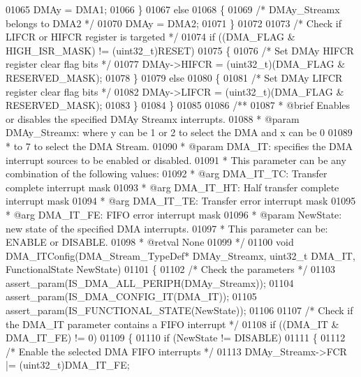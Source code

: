 \begin{DoxyCode}
01065     DMAy = DMA1;
01066   \}
01067   \textcolor{keywordflow}{else}
01068   \{
01069     \textcolor{comment}{/* DMAy\_Streamx belongs to DMA2 */}
01070     DMAy = DMA2;
01071   \}
01072 
01073   \textcolor{comment}{/* Check if LIFCR or HIFCR register is targeted */}
01074   \textcolor{keywordflow}{if} ((DMA\_FLAG & HIGH_ISR_MASK) != (uint32\_t)RESET)
01075   \{
01076     \textcolor{comment}{/* Set DMAy HIFCR register clear flag bits */}
01077     DMAy->HIFCR = (uint32\_t)(DMA\_FLAG & RESERVED_MASK);
01078   \}
01079   \textcolor{keywordflow}{else}
01080   \{
01081     \textcolor{comment}{/* Set DMAy LIFCR register clear flag bits */}
01082     DMAy->LIFCR = (uint32\_t)(DMA\_FLAG & RESERVED_MASK);
01083   \}
01084 \}
01085 
01086 \textcolor{comment}{/**}
01087 \textcolor{comment}{  * @brief  Enables or disables the specified DMAy Streamx interrupts.}
01088 \textcolor{comment}{  * @param  DMAy\_Streamx: where y can be 1 or 2 to select the DMA and x can be 0}
01089 \textcolor{comment}{  *          to 7 to select the DMA Stream.}
01090 \textcolor{comment}{  * @param DMA\_IT: specifies the DMA interrupt sources to be enabled or disabled. }
01091 \textcolor{comment}{  *          This parameter can be any combination of the following values:}
01092 \textcolor{comment}{  *            @arg DMA\_IT\_TC:  Transfer complete interrupt mask}
01093 \textcolor{comment}{  *            @arg DMA\_IT\_HT:  Half transfer complete interrupt mask}
01094 \textcolor{comment}{  *            @arg DMA\_IT\_TE:  Transfer error interrupt mask}
01095 \textcolor{comment}{  *            @arg DMA\_IT\_FE:  FIFO error interrupt mask}
01096 \textcolor{comment}{  * @param  NewState: new state of the specified DMA interrupts.}
01097 \textcolor{comment}{  *          This parameter can be: ENABLE or DISABLE.}
01098 \textcolor{comment}{  * @retval None}
01099 \textcolor{comment}{  */}
01100 \textcolor{keywordtype}{void} DMA_ITConfig(DMA\_Stream\_TypeDef* DMAy\_Streamx, uint32\_t DMA\_IT, FunctionalState NewState)
01101 \{
01102   \textcolor{comment}{/* Check the parameters */}
01103   assert_param(IS\_DMA\_ALL\_PERIPH(DMAy\_Streamx));
01104   assert_param(IS\_DMA\_CONFIG\_IT(DMA\_IT));
01105   assert_param(IS\_FUNCTIONAL\_STATE(NewState));
01106 
01107   \textcolor{comment}{/* Check if the DMA\_IT parameter contains a FIFO interrupt */}
01108   \textcolor{keywordflow}{if} ((DMA\_IT & DMA_IT_FE) != 0)
01109   \{
01110     \textcolor{keywordflow}{if} (NewState != DISABLE)
01111     \{
01112       \textcolor{comment}{/* Enable the selected DMA FIFO interrupts */}
01113       DMAy\_Streamx->FCR |= (uint32\_t)DMA_IT_FE;

\end{DoxyCode}
